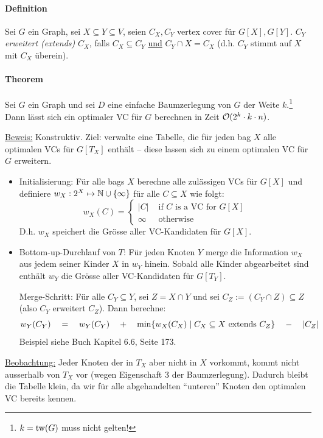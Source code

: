\paragraph{Definition}
Sei $G$ ein Graph, sei $X \subseteq Y \subseteq V $, seien $C_X, C_Y$ vertex cover für $G[X], G[Y]$.
$C_Y$ \emph{erweitert (extends)} $C_X$, falls $C_X \subseteq C_Y$ \underline{und} $C_Y \cap X = C_X$
(d.h. $C_Y$ stimmt auf $X$ mit $C_X$ überein).

\paragraph{Theorem}
Sei $G$ ein Graph und sei $D$ eine einfache Baumzerlegung von $G$ der Weite $k$.\footnote{$k = \text{tw}(G)$ muss nicht gelten!}
Dann lässt sich ein optimaler VC für $G$ berechnen in Zeit $\mathcal{O} (2^k \cdot k \cdot n)$.

\underline{Beweis:} Konstruktiv.
Ziel: verwalte eine Tabelle, die für jeden bag $X$ alle optimalen VCs für $G[T_X]$ enthält -- diese lassen sich
zu einem optimalen VC für $G$ erweitern.
\begin{itemize}
    \item[1)] Initialisierung:
    Für alle bags $X$ berechne alle zulässigen VCs für $G[X]$
    und definiere $w_X : 2^X \mapsto \mathbb{N} \cup \{\infty\}$ für alle $C \subseteq X$ wie folgt:
    $$ w_X (C) = \begin{cases}
    |C| & \text{ if $C$ is a VC for $G[X]$} \\
    \infty & \text{ otherwise}
    \end{cases}$$
    D.h. $w_X$ speichert die Grösse aller VC-Kandidaten für $G[X]$.
    \item[2)] Bottom-up-Durchlauf von $T$:
    Für jeden Knoten $Y$ merge die Information $w_X$ aus jedem seiner Kinder $X$ in $w_Y$ hinein.
    Sobald alle Kinder abgearbeitet sind enthält $w_Y$ die Grösse aller VC-Kandidaten für $G[T_Y]$.

    Merge-Schritt:
    Für alle $C_Y \subseteq Y$, sei $Z = X \cap Y$ und sei $C_Z := (C_Y \cap Z) \subseteq Z$
    (also $C_Y$ erweitert $C_Z$). Dann berechne:
    $$
    w_Y (C_Y) \quad = \quad w_Y (C_Y)
    \quad + \quad \min \{ w_X (C_X) \; | \; C_X \subseteq X \text{ extends } C_Z \} \quad - \quad |C_Z|
    $$
    Beispiel siehe Buch Kapitel 6.6, Seite 173.
\end{itemize}

\underline{Beobachtung:} Jeder Knoten der in $T_X$ aber nicht in $X$ vorkommt, kommt nicht ausserhalb von $T_X$ vor
(wegen Eigenschaft 3 der Baumzerlegung).
Dadurch bleibt die Tabelle klein, da wir für alle abgehandelten ``unteren'' Knoten den optimalen VC bereits kennen.

